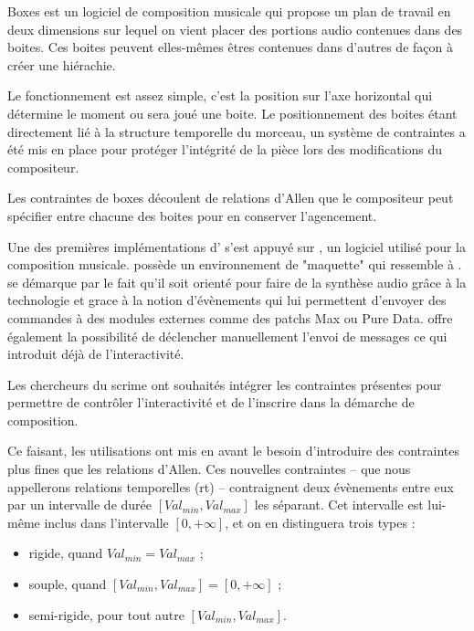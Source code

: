 Boxes\cite{Beurive2000boxes} est un logiciel de composition musicale qui propose un plan de travail en deux dimensions  sur lequel on vient placer des portions audio contenues dans des boites. Ces boites peuvent elles-mêmes êtres contenues dans d'autres de façon à créer une hiérachie.


Le fonctionnement est assez simple, c'est la position sur l'axe horizontal qui détermine le moment ou sera joué une boite. Le positionnement des boites étant directement lié à la structure temporelle du morceau, un système de contraintes a été mis en place pour protéger l'intégrité de la pièce lors des modifications du compositeur.

Les contraintes de boxes découlent de relations d'Allen  que le compositeur peut spécifier entre chacune des boites pour en conserver l'agencement.


Une des premières implémentations d'\iscore{} s'est appuyé sur \openmusic{}, un logiciel utilisé pour la composition musicale. \openmusic{} possède un environnement de "maquette" qui ressemble à \boxes{}. \openmusic{} se démarque par le fait qu'il soit orienté pour faire de la synthèse audio grâce à la technologie \osc{} et grace à la notion d'évènements qui lui permettent d'envoyer des commandes à des modules externes comme des patchs Max ou Pure Data. \openmusic{} offre également la possibilité de déclencher manuellement l'envoi de messages \osc{} ce qui introduit déjà de l'interactivité.

Les chercheurs du \acrshort{scrime}\cite{Scrime2015} ont souhaités intégrer les contraintes présentes \boxes{}\cite{allombert:hal-00353628} pour permettre de contrôler l'interactivité et de l'inscrire dans la démarche de composition.

Ce faisant, les utilisations ont mis en avant le besoin d'introduire des contraintes plus fines que les relations d'Allen. Ces nouvelles contraintes -- que nous appellerons relations temporelles (\acrshort{rt}) -- contraignent deux évènements entre eux par un intervalle de durée $[Val_{min}, Val_{max}]$ les séparant. Cet intervalle est lui-même inclus dans l'intervalle $[0,+\infty]$, et on en distinguera trois types :

\begin{itemize}
\item rigide, quand $Val_{min} = Val_{max}$ ;
\item souple, quand $[Val_{min}, Val_{max}] = [0,+\infty]$ ;
\item semi-rigide, pour tout autre $[Val_{min}, Val_{max}]$.
\end{itemize}

